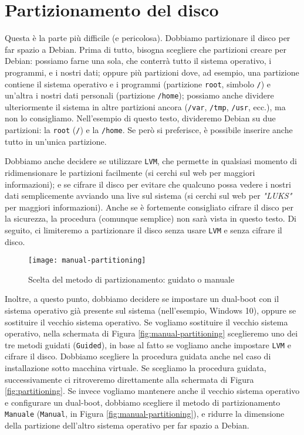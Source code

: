 \section{Partizionamento del disco}
Questa è la parte più difficile (e pericolosa). Dobbiamo partizionare il disco per far spazio a Debian. Prima di tutto, bisogna scegliere che partizioni creare per Debian: possiamo farne una sola, che conterrà tutto il sistema operativo, i programmi, e i nostri dati; oppure più partizioni dove, ad esempio, una partizione contiene il sistema operativo e i programmi (partizione \texttt{root}, simbolo \texttt{/}) e un'altra i nostri dati personali (partizione \texttt{/home}); possiamo anche dividere ulteriormente il sistema in altre partizioni ancora (\texttt{/var}, \texttt{/tmp}, \texttt{/usr}, ecc.), ma non lo consigliamo. Nell'esempio di questo testo, divideremo Debian su due partizioni: la \texttt{root} (\texttt{/}) e la \texttt{/home}. Se però si preferisce, è possibile inserire anche tutto in un'unica partizione.

Dobbiamo anche decidere se utilizzare \texttt{LVM}, che permette in qualsiasi momento di ridimensionare le partizioni facilmente (si cerchi sul web per maggiori informazioni); e se cifrare il disco per evitare che qualcuno possa vedere i nostri dati semplicemente avviando una live sul sistema (si cerchi sul web per \textit{"LUKS"} per maggiori informazioni). Anche se è fortemente consigliato cifrare il disco per la sicurezza, la procedura (comunque semplice) non sarà vista in questo testo. Di seguito, ci limiteremo a partizionare il disco senza usare \texttt{LVM} e senza cifrare il disco.

\begin{figure}[ht]
	\centering
	\texttt{[image: manual-partitioning]}
	\caption{Scelta del metodo di partizionamento: guidato o manuale}
	\label{fig:manual-partitioning}
\end{figure}

Inoltre, a questo punto, dobbiamo decidere se impostare un dual-boot con il sistema operativo già presente sul sistema (nell'esempio, Windows 10), oppure se sostituire il vecchio sistema operativo. Se vogliamo sostituire il vecchio sistema operativo, nella schermata di Figura \vref{fig:manual-partitioning} sceglieremo uno dei tre metodi guidati (\texttt{Guided}), in base al fatto se vogliamo anche impostare \texttt{LVM} e cifrare il disco. Dobbiamo scegliere la procedura guidata anche nel caso di installazione sotto macchina virtuale. Se scegliamo la procedura guidata, successivamente ci ritroveremo direttamente alla schermata di Figura \vref{fig:partitioning}.
Se invece vogliamo mantenere anche il vecchio sistema operativo e configurare un dual-boot, dobbiamo scegliere il metodo di partizionamento \texttt{Manuale} (\texttt{Manual}, in Figura \vref{fig:manual-partitioning}), e ridurre la dimensione della partizione dell'altro sistema operativo per far spazio a Debian.


